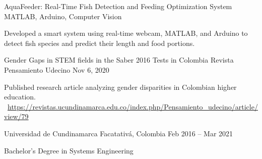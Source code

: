 \documentclass[]{awesome-cv}
\begin{document}
\begin{cventries}
	\vspace{-1mm}
	\cventry
	{}
	{AquaFeeder: Real-Time Fish Detection and Feeding Optimization System \vspace{-5mm}}
	{MATLAB, Arduino, Computer Vision \vspace{-5mm}}
	{}
	{\begin{cvsectionnormaltext}
		\item{Developed a smart system using real-time webcam, MATLAB, and Arduino to detect fish species and predict their length and food portions. }
	\end{cvsectionnormaltext}}	
	
	\vspace{-4mm}
	\cventry
	{}
	{Gender Gaps in STEM fields in the Saber 2016 Tests in Colombia \vspace{-5mm}}
	{Revista Pensamiento Udecino \vspace{-5mm}}
	{Nov 6, 2020 \vspace{-5mm}}
	{\begin{cvsectionnormaltext}
		\item{Published research article analyzing gender disparities in Colombian higher education. 
		\newline \faLink\ \href{https://revistas.ucundinamarca.edu.co/index.php/Pensamiento_udecino/article/view/79}{https://revistas.ucundinamarca.edu.co/index.php/Pensamiento\_udecino/article/view/79}}
	\end{cvsectionnormaltext}}
	
	\vspace{-6mm}
	
\end{cventries}

\vspace{2mm}
\begin{cventries}
	\vspace{-3mm}
	\cventry
	{}
	{Universidad de Cundinamarca \vspace{-5mm}}
	{Facatativá, Colombia \vspace{-5mm}}
	{Feb 2016 – Mar 2021 \vspace{-5mm}}
	{\begin{cvsectionnormaltext} 
		\item{Bachelor's Degree in Systems Engineering}
	\end{cvsectionnormaltext}}
\end{cventries}
\end{document}
